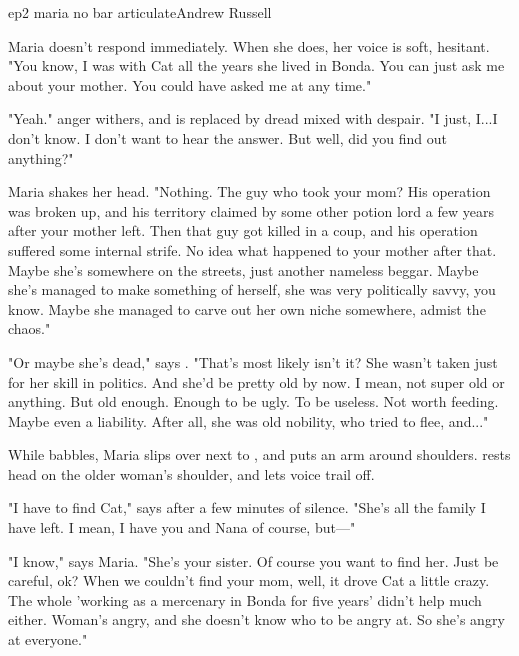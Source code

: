 \documentclass{book}
\begin{document}
\begin{childnode}{ep2 maria no bar articulate}{Andrew Russell}


    Maria doesn't respond immediately. When she does, her voice is soft, hesitant. "You know, I was with Cat all the years she lived in Bonda. You can just ask me about your mother. You could have asked me at any time."

    "Yeah." \names{} anger withers, and is replaced by dread mixed with despair. "I just, I...I don't know. I don't want to hear the answer. But well, did you find out anything?"

    Maria shakes her head. "Nothing. The guy who took your mom? His operation was broken up, and his territory claimed by some other potion lord a few years after your mother left. Then that guy got killed in a coup, and his operation suffered some 
    internal strife. No idea what happened to your mother after that. Maybe she's somewhere on the streets, just another nameless beggar. Maybe she's managed to make something of herself, she was 
    very politically savvy, you know. Maybe she managed to carve out
    her own niche somewhere, admist the chaos."

    "Or maybe she's dead," says \name{}. "That's most likely isn't it? She wasn't taken just for her skill in politics. And she'd be pretty old by now. I mean, not super 
    old or anything. But old enough. Enough to be ugly. To be useless. Not worth feeding. Maybe even a liability. After all, she was old nobility, who tried to flee, and..."

    While \name{} babbles, Maria slips over next to \himher{}, and puts an arm around \hisher{} shoulders. \name{} rests \hisher{} head on the older woman's shoulder, and lets \hisher{} voice trail 
    off.

    "I have to find Cat," says \name{} after a few minutes of silence. "She's all the family I have left. I mean, I have you and Nana of course, but---"

    "I know," says Maria. "She's your sister. Of course you want to find her. Just be careful, ok? When we couldn't find your mom, well, it drove Cat a little crazy. The whole 'working as a mercenary in Bonda for five years' didn't help much either. Woman's angry,
    and she doesn't know who to be angry at. So she's angry at everyone."


\end{childnode}
\end{document}
